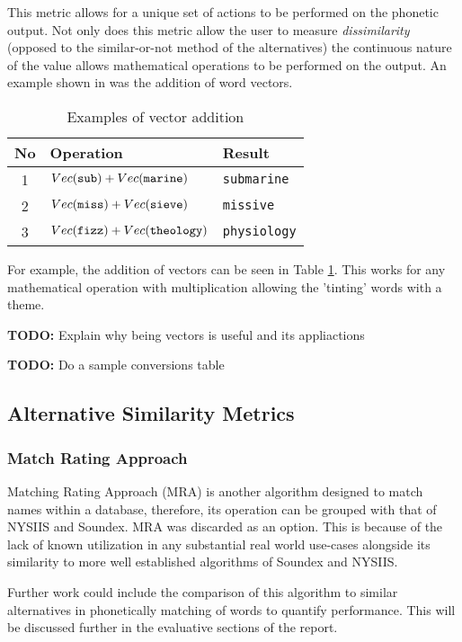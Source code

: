 This metric allows for a unique set of actions to be performed on the phonetic output. Not only does this metric allow the user to measure \textit{dissimilarity} (opposed to the similar-or-not method of the alternatives) the continuous nature of the value allows mathematical operations to be performed on the output. An example shown in \cite{parrish2017poetic} was the addition of word vectors.

\begin{table}[!htb]
    \centering
    \begin{tabular}{cll}
        No & Operation & Result \\
        \hline
        1  & $Vec(\verb|sub|) + Vec(\verb|marine|)$ & \verb|submarine| \\
        2  & $Vec(\verb|miss|) + Vec(\verb|sieve|)$ & \verb|missive| \\
        3  & $Vec(\verb|fizz|) + Vec(\verb|theology|)$ & \verb|physiology| \\
    \end{tabular}
    \caption{Examples of vector addition}
    \label{tab:vectorAdd}
\end{table}

For example, the addition of vectors can be seen in Table \ref{tab:vectorAdd}. This works for any mathematical operation with multiplication allowing the 'tinting' words with a theme. 

\textbf{TODO: } Explain why being vectors is useful and its appliactions

\textbf{TODO: } Do a sample conversions table

\subsection{Alternative Similarity Metrics}

\subsubsection{Match Rating Approach}
Matching Rating Approach (MRA) is another algorithm designed to match names within a database, therefore, its operation can be grouped with that of NYSIIS and Soundex. MRA was discarded as an option. This is because of the lack of known utilization in any substantial real world use-cases alongside its similarity to more well established algorithms of Soundex and NYSIIS.

Further work could include the comparison of this algorithm  to similar alternatives in phonetically matching of words to quantify performance. This will be discussed further in the evaluative sections of the report.

